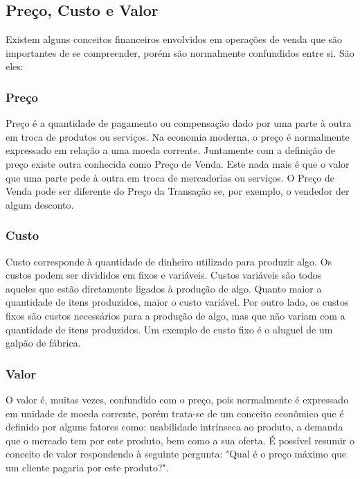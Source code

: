 \documentclass[12pt]{article}
\begin{document}
\subsection{Preço, Custo e Valor}
	
	Existem alguns conceitos financeiros envolvidos em operações de venda que são importantes de se compreender, porém são normalmente confundidos entre si. São eles:

\subsubsection{Preço}

	Preço é a quantidade de pagamento ou compensação dado por uma parte à outra em troca de produtos ou serviços. Na economia moderna, o preço é normalmente expressado em relação a uma moeda corrente. Juntamente com a definição de preço existe outra conhecida como Preço de Venda. Este nada mais é que o valor que uma parte pede à outra em troca de mercadorias ou serviços. O Preço de Venda pode ser diferente do Preço da Transação se, por exemplo, o vendedor der algum desconto.

\subsubsection{Custo}

	Custo corresponde à quantidade de dinheiro utilizado para produzir algo. Os custos podem ser divididos em fixos e variáveis. Custos variáveis são todos aqueles que estão diretamente ligados à produção de algo. Quanto maior a quantidade de itens produzidos, maior o custo variável. Por outro lado, os custos fixos são custos necessários para a produção de algo, mas que não variam com a quantidade de itens produzidos. Um exemplo de custo fixo é o aluguel de um galpão de fábrica.

\subsubsection{Valor}

	O valor é, muitas vezes, confundido com o preço, pois normalmente é expressado em unidade de moeda corrente, porém trata-se de um conceito econômico que é definido por alguns fatores como: usabilidade intrínseca ao produto, a demanda que o mercado tem por este produto, bem como a sua oferta. É possível resumir o conceito de valor respondendo à seguinte pergunta: "Qual é o preço máximo que um cliente pagaria por este produto?".
\end{document}
